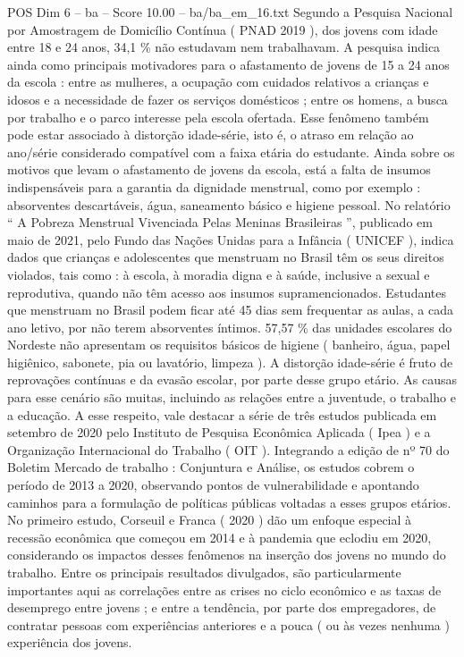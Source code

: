 \begin{textsample}{POS Dim 6 – ba – Score 10.00 – ba/ba\_em\_16.txt}
Segundo a Pesquisa Nacional por Amostragem de Domicílio Contínua ( PNAD 2019 ), dos jovens com idade entre 18 e 24 anos, 34,1 \% não estudavam nem trabalhavam.
A pesquisa indica ainda como principais motivadores para o afastamento de jovens de 15 a 24 anos da escola : entre as mulheres, a ocupação com cuidados relativos a crianças e idosos e a necessidade de fazer os serviços domésticos ; entre os homens, a busca por trabalho e o parco interesse pela escola ofertada.
Esse fenômeno também pode estar associado à distorção idade-série, isto é, o atraso em relação ao ano/série considerado compatível com a faixa etária do estudante.
Ainda sobre os motivos que levam o afastamento de jovens da escola, está a falta de insumos indispensáveis para a garantia da dignidade menstrual, como por exemplo : absorventes descartáveis, água, saneamento básico e higiene pessoal.
No relatório “ A Pobreza Menstrual Vivenciada Pelas Meninas Brasileiras ”, publicado em maio de 2021, pelo Fundo das Nações Unidas para a Infância ( UNICEF ), indica dados que crianças e adolescentes que menstruam no Brasil têm os seus direitos violados, tais como : à escola, à moradia digna e à saúde, inclusive a sexual e reprodutiva, quando não têm acesso aos insumos supramencionados.
Estudantes que menstruam no Brasil podem ficar até 45 dias sem frequentar as aulas, a cada ano letivo, por não terem absorventes íntimos. 57,57 \% das unidades escolares do Nordeste não apresentam os requisitos básicos de higiene ( banheiro, água, papel higiênico, sabonete, pia ou lavatório, limpeza ).
A distorção idade-série é fruto de reprovações contínuas e da evasão escolar, por parte desse grupo etário.
As causas para esse cenário são muitas, incluindo as relações entre a juventude, o trabalho e a educação.
A esse respeito, vale destacar a série de três estudos publicada em setembro de 2020 pelo Instituto de Pesquisa Econômica Aplicada ( Ipea ) e a Organização Internacional do Trabalho ( OIT ).
Integrando a edição de nº 70 do Boletim Mercado de trabalho : Conjuntura e Análise, os estudos cobrem o período de 2013 a 2020, observando pontos de vulnerabilidade e apontando caminhos para a formulação de políticas públicas voltadas a esses grupos etários.
No primeiro estudo, Corseuil e Franca ( 2020 ) dão um enfoque especial à recessão econômica que começou em 2014 e à pandemia que eclodiu em 2020, considerando os impactos desses fenômenos na inserção dos jovens no mundo do trabalho.
Entre os principais resultados divulgados, são particularmente importantes aqui as correlações entre as crises no ciclo econômico e as taxas de desemprego entre jovens ; e entre a tendência, por parte dos empregadores, de contratar pessoas com experiências anteriores e a pouca ( ou às vezes nenhuma ) experiência dos jovens.

\end{textsample}
